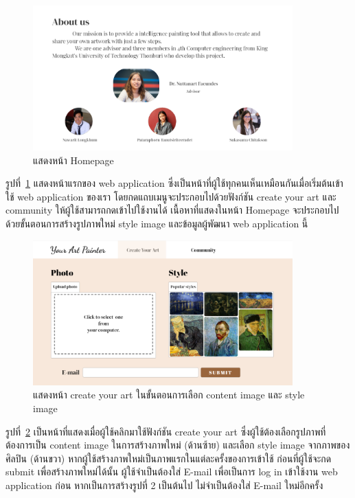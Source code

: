 \documentclass[12pt,oneside,openright,a4paper]{cpe-thai-project}
\begin{document}
\begin{figure}[!h]
  \centering
  \includegraphics[width=10cm]{./image/ui1-4.png}
  \caption{แสดงหน้า Homepage}
  \label{fig:ui-1}
\end{figure}

\newpage

\par\setlength{\parindent}{5ex}
รูปที่~\ref{fig:ui-1} แสดงหน้าแรกของ web application ซึ่งเป็นหน้าที่ผู้ใช้ทุกคนเห็นเหมือนกันเมื่อเริ่มต้นเข้าใช้ web application ของเรา โดยกดแถบเมนูจะประกอบไปด้วยฟังก์ชัน create your art และ community ให้ผู้ใช้สามารถกดเข้าไปใช้งานได้ เนื้อหาที่แสดงในหน้า Homepage จะประกอบไปด้วยขั้นตอนการสร้างรูปภาพใหม่ style image และข้อมูลผู้พัฒนา web application นี้

\begin{figure}[!h]
  \centering
  \includegraphics[width=10cm]{./image/ui-create.png}
  \caption{แสดงหน้า create your art ในขั้นตอนการเลือก content image และ style image}
  \label{fig:ui-create}
\end{figure}
\par\setlength{\parindent}{5ex}
รูปที่~\ref{fig:ui-create} เป็นหน้าที่แสดงเมื่อผู้ใช้คลิกมาใช้ฟังก์ชัน create your art ซึ่งผู้ใช้ต้องเลือกรูปภาพที่ต้องการเป็น content image ในการสร้างภาพใหม่ (ด้านซ้าย) และเลือก style image จากภาพของศิลปิน (ด้านขวา) หากผู้ใช้สร้างภาพใหม่เป็นภาพแรกในแต่ละครั้งของการเข้าใช้ ก่อนที่ผู้ใช้จะกด submit เพื่อสร้างภาพใหม่ได้นั้น ผู้ใช้จำเป็นต้องใส่ E-mail เพื่อเป็นการ log in เข้าใช้งาน web application ก่อน หากเป็นการสร้างรูปที่ 2 เป็นต้นไป ไม่จำเป็นต้องใส่ E-mail ใหม่อีกครั้ง
\end{document}
